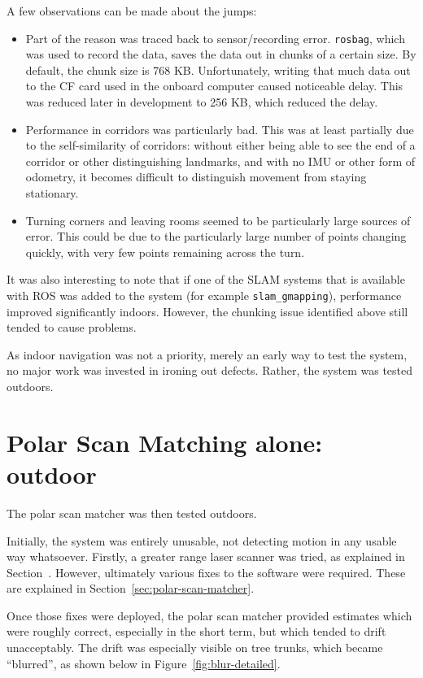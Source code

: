 \documentclass[12pt,oneside,a4paper]{book}
\begin{document}
A few observations can be made about the jumps:
\begin{itemize}
\item Part of the reason was traced back to sensor/recording
  error. \texttt{rosbag}, which was used to record the data, saves the
  data out in chunks of a certain size. By default, the chunk size is
  768 KB. Unfortunately, writing that much data out to the CF card
  used in the onboard computer caused noticeable delay. This was
  reduced later in development to 256 KB, which reduced the delay.
\item Performance in corridors was particularly bad. This was at least
  partially due to the self-similarity of corridors: without either
  being able to see the end of a corridor or other distinguishing
  landmarks, and with no IMU or other form of odometry, it becomes
  difficult to distinguish movement from staying stationary.
\item Turning corners and leaving rooms seemed to be particularly
  large sources of error. This could be due to the particularly large
  number of points changing quickly, with very few points remaining
  across the turn.
\end{itemize}

It was also interesting to note that if one of the SLAM systems that
is available with ROS was added to the system (for example
\texttt{slam\_gmapping}), performance improved significantly
indoors. However, the chunking issue identified above still tended to
cause problems.

As indoor navigation was not a priority, merely an early way to test
the system, no major work was invested in ironing out defects. Rather,
the system was tested outdoors.

\section{Polar Scan Matching alone: outdoor}
\label{sec:psm-outdoor}

The polar scan matcher was then tested outdoors.

Initially, the system was entirely unusable, not detecting motion in
any usable way whatsoever. Firstly, a greater range laser scanner
was tried, as explained in Section~. However, ultimately
various fixes to the software were required. These are explained in
Section~\ref{sec:polar-scan-matcher}.

Once those fixes were deployed, the polar scan matcher provided
estimates which were roughly correct, especially in the short term,
but which tended to drift unacceptably. The drift was especially
visible on tree trunks, which became ``blurred'', as shown below in
Figure~\ref{fig:blur-detailed}. 
\end{document}
